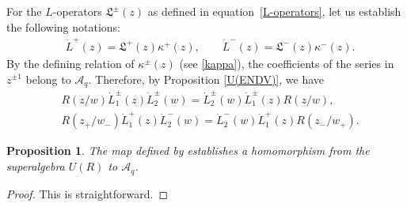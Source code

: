 \documentclass[10pt,a4paper]{amsart}
\numberwithin{equation}{section}
\newtheorem{Proposition}[Theorem]{Proposition}
 { \theoremstyle{definition}
\newtheorem{Definition}[Theorem]{Definition}
\newtheorem{Note}[Theorem]{Note}
\newtheorem{Example}[Theorem]{Example}
\newtheorem{Remark}[Theorem]{Remark} }
\begin{document}
For the $L$-operators $\mathfrak{L}^{\pm}(z)$ as defined in equation~\eqref{L-operators}, let us establish the following notations:
\begin{align*}
 &\dot{L}^+(z)=\mathfrak{L}^+(z)\kappa^{+}(z), \qquad
 \dot{L}^-(z)=\mathfrak{L}^-(z)\kappa^{-}(z).
\end{align*}By the defining relation of $\kappa^{\pm}(z)$ (see \eqref{kappa}), the coefficients of the series in $z^{\pm1}$ belong to $\mathcal{A}_q$. Therefore, by Proposition \ref{U(ENDV)}, we have
\begin{align*}
 &R(z/w)\dot{L}_1^{\pm}(z)\dot{L}_2^{\pm}(w)=\dot{L}_2^{\pm}(w)\dot{L}_1^{\pm}(z) R(z/w),\\
 &R(z_+/w_-)\dot{L}_1^{+}(z)\dot{L}_2^{-}(w)=\dot{L}_2^{-}(w)\dot{L}_1^{+}(z) R(z_-/w_+).
\end{align*}

\begin{Proposition} The map defined by
establishes a homomorphism from the superalgebra $U(R)$ to $\mathcal{A}_q$.
\end{Proposition}
\begin{proof}
This is straightforward.
\end{proof}
\end{document}
